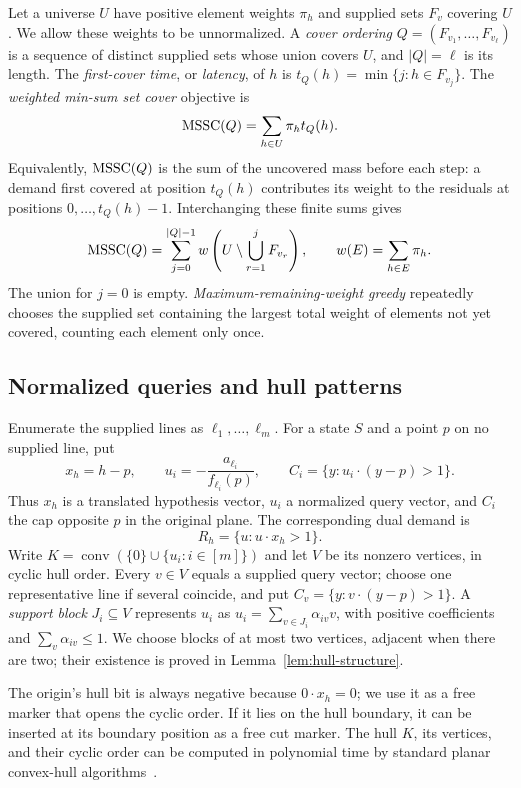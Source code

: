 Let a universe $U$ have positive element weights $\pi_h$ and supplied
sets $F_v$ covering $U$. We allow these weights to be unnormalized.
A \emph{cover ordering}
$Q=(F_{v_1},\ldots,F_{v_\ell})$ is a sequence of distinct supplied
sets whose union covers $U$, and $|Q|=\ell$ is its length.
The \emph{first-cover time}, or \emph{latency}, of $h$ is
$t_Q(h)=\min\{j:h\in F_{v_j}\}$.
The \emph{weighted min-sum set cover} objective is
\[
 \operatorname{MSSC}(Q)=\sum_{h\in U}\pi_h t_Q(h).
\]
Equivalently, $\operatorname{MSSC}(Q)$ is the sum of the uncovered mass before
each step: a demand first covered at position $t_Q(h)$ contributes
its weight to the residuals at positions
$0,\ldots,t_Q(h)-1$. Interchanging these finite sums gives
\[
 \operatorname{MSSC}(Q)=
 \sum_{j=0}^{|Q|-1}
 w\left(U\setminus\bigcup_{r=1}^{j}F_{v_r}\right),
 \qquad w(E)=\sum_{h\in E}\pi_h.
\]
The union for $j=0$ is empty. \emph{Maximum-remaining-weight greedy}
repeatedly chooses the supplied set containing the largest total
weight of elements not yet covered, counting each element only once.

\subsection{Normalized queries and hull patterns}

\begin{definition}\label{def:normalized-queries}
Enumerate the supplied lines as $\ell_1,\ldots,\ell_m$.
For a state $S$ and a point $p$ on no supplied line, put
\[
 x_h=h-p,\qquad
 u_i=-\frac{a_{\ell_i}}{f_{\ell_i}(p)},\qquad
 C_i=\{y:u_i\cdot(y-p)>1\}.
\]
Thus $x_h$ is a translated hypothesis vector, $u_i$ a normalized
query vector, and $C_i$ the cap opposite $p$ in the original plane.
The corresponding dual demand is
\[
 R_h=\{u:u\cdot x_h>1\}.
\]
Write $K=\operatorname{conv}(\{0\}\cup\{u_i:i\in[m]\})$ and let
$V$ be its nonzero vertices, in cyclic hull order.
Every $v\in V$ equals a supplied query vector; choose one
representative line if several coincide, and put
$C_v=\{y:v\cdot(y-p)>1\}$.
A \emph{support block} $J_i\subseteq V$ represents $u_i$ as
$u_i=\sum_{v\in J_i}\alpha_{iv}v$, with positive coefficients
and $\sum_v\alpha_{iv}\le1$. We choose blocks of at most two
vertices, adjacent when there are two; their existence is proved
in Lemma~\ref{lem:hull-structure}.
\end{definition}

The origin's hull bit is always negative because $0\cdot x_h=0$;
we use it as a free marker that opens the cyclic order. If it lies on
the hull boundary, it can be inserted
at its boundary position as a free cut marker. The hull $K$, its
vertices, and their cyclic order can be computed in polynomial time
by standard planar convex-hull algorithms~\cite{deberg2008}.

